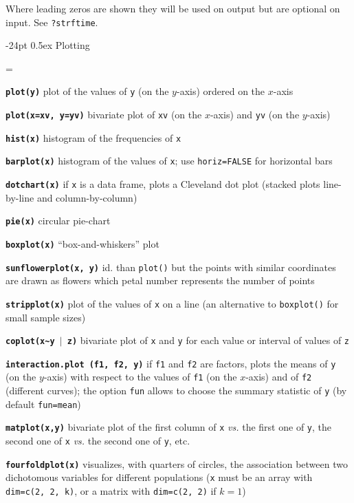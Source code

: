 \documentclass[8pt,landscape]{article}
\makeatletter
\renewcommand\section{\@startsection{section}{1}{0mm}%
                                     {-24pt}%
                                     {0.5ex}%
                                {\color{blue}\normalfont\large\bfseries}}
\newcommand{\code}{\texttt}
\newcommand{\bcode}[1]{\texttt{\textbf{#1}}}
\makeatother
\begin{document}
\begin{multicols*}{3}
Where leading zeros are shown they will be used on output but are
optional on input. See \code{?strftime}.  





\section{Plotting}

\everypar={\hangindent=9mm}

\bcode{plot(y)}  plot of the values of \code{y} (on the $y$-axis) ordered on the $x$-axis

\bcode{plot(x=xv, y=yv)}  bivariate plot of \code{xv} (on the $x$-axis) and \code{yv} (on the $y$-axis)

\bcode{hist(x)}  histogram of the frequencies of \code{x}

\bcode{barplot(x)}  histogram of the values of \code{x}; use
\code{horiz=FALSE} for horizontal bars

\bcode{dotchart(x)}  if \code{x} is a data frame, plots a Cleveland dot plot (stacked plots line-by-line and column-by-column)

\bcode{pie(x)}  circular pie-chart

\bcode{boxplot(x)}  ``box-and-whiskers'' plot

\bcode{sunflowerplot(x, y)}  id. than \code{plot()} but the points with similar coordinates are drawn as flowers which petal number represents the number of points

\bcode{stripplot(x)}  plot of the values of \code{x} on a line (an alternative to \code{boxplot()} for small sample sizes)

\bcode{coplot(x\~{}y $\mid$ z)}  bivariate plot of \code{x} and \code{y} for each value or interval of values of \code{z}

\bcode{interaction.plot (f1, f2, y)}  if \code{f1} and \code{f2} are factors, plots the means of \code{y} (on the $y$-axis) with respect to the values of \code{f1} (on the $x$-axis) and of \code{f2} (different curves); the option \code{fun} allows to choose the summary statistic of \code{y} (by default \code{fun=mean})

\bcode{matplot(x,y)}  bivariate plot of the first column of \code{x} {\it vs.} the first one of \code{y}, the second one of \code{x} {\it vs.} the second one of \code{y}, etc.

\bcode{fourfoldplot(x)}  visualizes, with quarters of circles, the association between two dichotomous variables for different populations (\code{x} must be an array with \code{dim=c(2, 2, k)}, or a matrix with \code{dim=c(2, 2)} if $k=1$)


\end{multicols*}
\end{document}
